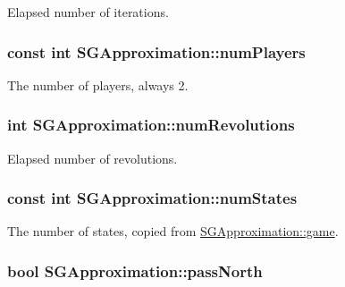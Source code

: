 Elapsed number of iterations. \hypertarget{classSGApproximation_aad4f5b13c4d578cc7a2c9d2290de2524}{
\subsubsection[{num\-Players}]{\setlength{\rightskip}{0pt plus 5cm}const int S\-G\-Approximation\-::num\-Players\hspace{0.3cm}{\ttfamily [private]}}}\label{classSGApproximation_aad4f5b13c4d578cc7a2c9d2290de2524}
The number of players, always 2. \hypertarget{classSGApproximation_a9772bd4fa2add763f1177f87149c5d07}{
\subsubsection[{num\-Revolutions}]{\setlength{\rightskip}{0pt plus 5cm}int S\-G\-Approximation\-::num\-Revolutions\hspace{0.3cm}{\ttfamily [private]}}}\label{classSGApproximation_a9772bd4fa2add763f1177f87149c5d07}
Elapsed number of revolutions. \hypertarget{classSGApproximation_a5de424fc814b5770fedc453052d61d3b}{
\subsubsection[{num\-States}]{\setlength{\rightskip}{0pt plus 5cm}const int S\-G\-Approximation\-::num\-States\hspace{0.3cm}{\ttfamily [private]}}}\label{classSGApproximation_a5de424fc814b5770fedc453052d61d3b}
The number of states, copied from \hyperlink{classSGApproximation_a3244a3d7de5f2b909d438f5b4ab337ee}{S\-G\-Approximation\-::game}. \hypertarget{classSGApproximation_a054de05172362fe53f74488e9ab5a026}{
\subsubsection[{pass\-North}]{\setlength{\rightskip}{0pt plus 5cm}bool S\-G\-Approximation\-::pass\-North\hspace{0.3cm}{\ttfamily [private]}}}\label{classSGApproximation_a054de05172362fe53f74488e9ab5a026}
